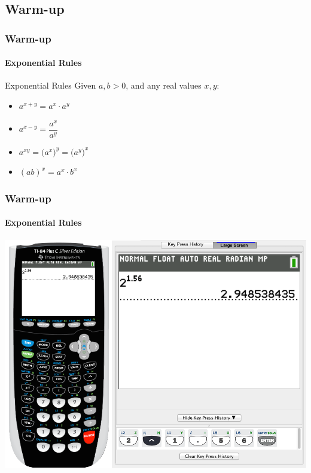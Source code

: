 \documentclass[9pt,xcolor=x11names,compress]{beamer}
\begin{document}
\subsection{Warm-up}

\begin{frame}[t]\frametitle{Warm-up}
    
\framesubtitle{Exponential Rules}

\begin{block}{Exponential Rules}
Given $a, b > 0$, and any real values $x,y$:
\begin{itemize}[<+-|alert@+>]
    \item $a^{x+y} = a^x \cdot a^y$
    \item $a^{x-y} = \dfrac{a^x }{ a^y} $
    \item $a^{xy} = \big( a^x \big)^y = \big(a^y \big)^x$
    \item $(ab)^x = a^x \cdot b^x$
\end{itemize}
\end{block}

\end{frame}

\begin{frame}[c]\frametitle{Warm-up}
\framesubtitle{Exponential Rules}
\begin{center}
\includegraphics[width=0.9\linewidth]{ti84exponential.png}
\end{center}
\end{frame}
\end{document}
